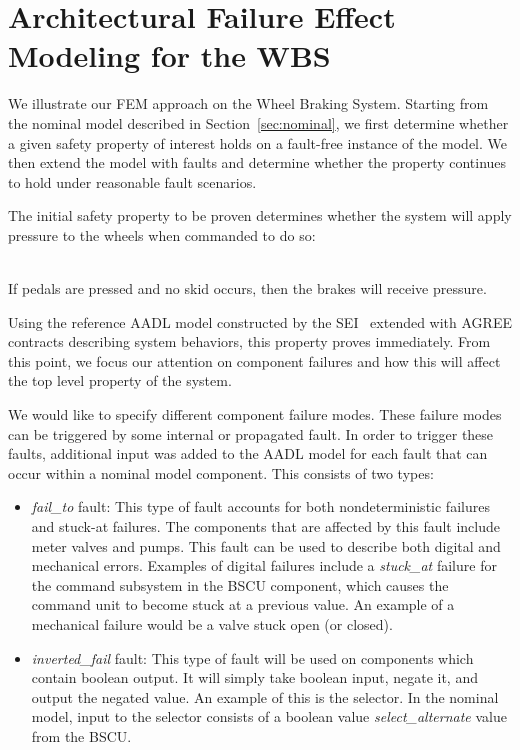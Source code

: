 \section{Architectural Failure Effect Modeling for the WBS}

We illustrate our FEM approach on the Wheel Braking System.  Starting from the nominal model described in Section~\ref{sec:nominal}, we first determine whether a given safety property of interest holds on a fault-free instance of the model.  We then extend the model with faults and determine whether the property continues to hold under reasonable fault scenarios.

The initial safety property to be proven determines whether the system will apply pressure to the wheels when commanded to do so:

\begin{tt}
\  \\
If pedals are pressed and no skid occurs, then the brakes will receive pressure. \\
\end{tt}

\noindent Using the reference AADL model constructed by the SEI~\cite{SEI:AADL} extended with AGREE contracts describing system behaviors, this property proves immediately.  From this point, we focus our attention on component failures and how this will affect the top level property of the system.

We would like to specify different component failure modes. These failure modes can be triggered by some internal or propagated fault. In order to trigger these faults, additional input was added to the AADL model for each fault that can occur within a nominal model component. This consists of two types:

\begin{itemize}
\item \textit{fail\_to} fault: This type of fault accounts for both nondeterministic failures and stuck-at failures. The components that are affected by this fault include meter valves and pumps. This fault can be used to describe both digital and mechanical errors. Examples of digital failures include a \textit{stuck\_at} failure for the command subsystem in the BSCU component, which causes the command unit to become stuck at a previous value. An example of a mechanical failure would be a valve stuck open (or closed).


\item \textit{inverted\_fail} fault: This type of fault will be used on components which contain boolean output. It will simply take boolean input, negate it, and output the negated value. An example of this is the selector. In the nominal model, input to the selector consists of a boolean value \textit{select\_alternate} value from the BSCU.

\end{itemize}

